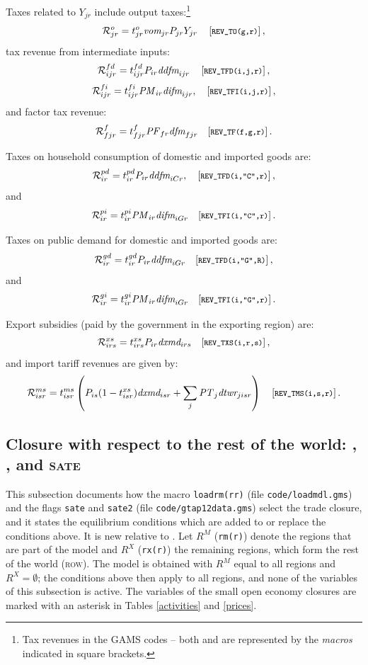 Taxes related to $Y_{jr}$ include output taxes:\footnote{Tax revenues
in the GAMS codes -- both \MCP and \MGE are represented by the
\textit{macros} indicated in square brackets.}
$$\mathcal{R}^o_{jr} =  t^o_{jr} \textit{vom}_{jr} P_{jr}
Y_{jr}\, \quad [\footnotesize{\texttt{REV\_TO(g,r)}}]\,,$$
tax revenue from intermediate inputs:
$$\mathcal{R}^{fd}_{ijr} =  t^{fd}_{ijr} P_{ir}
\textit{ddfm}_{ijr}\,  \quad [\footnotesize{\texttt{REV\_TFD(i,j,r)}}]\,,$$
$$\mathcal{R}^{fi}_{ijr} = t^{fi}_{ijr} \mathit{PM}_{ir}
\textit{difm}_{ijr}, \quad [\footnotesize{\texttt{REV\_TFI(i,j,r)}}]\,,$$
and factor tax revenue:
$$\mathcal{R}^f_{fjr} = t^{f}_{fjr} \mathit{PF}_{fr} \textit{dfm}_{fjr} \quad
[\footnotesize{\texttt{REV\_TF(f,g,r)}}]\,.$$

Taxes on household consumption of domestic and
imported goods are:
$$\mathcal{R}^{pd}_{ir} = t^{pd}_{ir} P_{ir} \textit{ddfm}_{iCr},
\quad [\footnotesize{\texttt{REV\_TFD(i,"C",r)}}]\,,$$
and
$$\mathcal{R}^{pi}_{ir} = t^{pi}_{ir} \mathit{PM}_{ir} \textit{difm}_{iGr}
\quad [\footnotesize{\texttt{REV\_TFI(i,"C",r)}}]\,.$$

Taxes on public demand for domestic and imported
goods are:
$$\mathcal{R}^{gd}_{ir} = t^{gd}_{ir} P_{ir} \textit{ddfm}_{iGr}
\quad [\footnotesize{\texttt{REV\_TFD(i,"G",R)}}]\,,$$
and
$$\mathcal{R}^{gi}_{ir} =  t^{gi}_{ir} \mathit{PM}_{ir} \textit{difm}_{iGr}
\quad [\footnotesize{\texttt{REV\_TFI(i,"G",r)}}]\,.$$

Export subsidies (paid by the government in the exporting region) are:
$$\mathcal{R}^{xs}_{irs} = t^{xs}_{irs} P_{ir}
\textit{dxmd}_{irs} \quad [\footnotesize{\texttt{REV\_TXS(i,r,s)}}]\,,$$
and import tariff revenues are given by:
$$\mathcal{R}^{ms}_{isr} = t^{ms}_{isr} \left(P_{is}
(1-t^{xs}_{isr}) \textit{dxmd}_{isr} + \sum_j \mathit{PT}_j \textit{dtwr}_{jisr}
\right) \quad [\footnotesize{\texttt{REV\_TMS(i,s,r)}}]\,.$$

\providecommand{\SATE}{\textsc{sate}\xspace}
\subsection[Closures]{Closure with respect to the rest of the world: \GMR, \SOE, and \SATE}\label{app:closures}

This subsection documents how the macro \texttt{loadrm(rr)} (file \texttt{code/loadmdl.gms}) and the flags \texttt{sate} and \texttt{sate2} (file \texttt{code/gtap12data.gms}) select the trade closure, and it states the equilibrium conditions which are added to or replace the conditions above.
It is new relative to \citet{LanzRutherford2016}.
Let $R^M$ (\texttt{rm(r)}) denote the regions that are part of the model and $R^X$ (\texttt{rx(r)}) the remaining regions, which form the rest of the world (\textsc{row}).
The \GMR model is obtained with $R^M$ equal to all regions and $R^X=\emptyset$; the conditions above then apply to all regions, and none of the variables of this subsection is active.
The variables of the small open economy closures are marked with an asterisk in Tables \ref{activities} and \ref{prices}.

